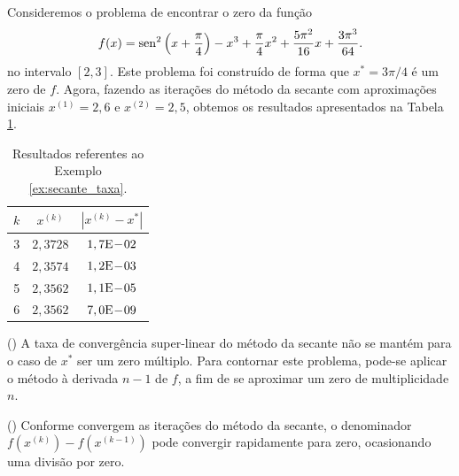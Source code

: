 \begin{ex}\label{ex:secante_taxa}
  Consideremos o problema de encontrar o zero da função
  \begin{equation}
    f(x) = \operatorname{sen}^2\left(x+\frac{\pi}{4}\right) - x^3 + \frac{\pi}{4}x^2 + \frac{5\pi^2}{16}x + \frac{3\pi^3}{64}.
  \end{equation}
  no intervalo $[2,3]$. Este problema foi construído de forma que $x^* = 3\pi/4$ é um zero de $f$. Agora, fazendo as iterações do método da secante com aproximações iniciais $x^{(1)}=2,6$ e $x^{(2)}=2,5$, obtemos os resultados apresentados na Tabela \ref{tab:ex_secante_taxa}.

\begin{table}[h!]
  \centering
  \caption{Resultados referentes ao Exemplo \ref{ex:secante_taxa}.}
  \label{tab:ex_secante_taxa}
  \begin{tabular}{r|cc}
    $k$ & $x^{(k)}$ & $|x^{(k)}-x^*|$ \\\hline
    3 & $2,3728$ & $1,7\mathrm{E}\!-\!02$ \\
    4 & $2,3574$ & $1,2\mathrm{E}\!-\!03$ \\
    5 & $2,3562$ & $1,1\mathrm{E}\!-\!05$ \\
    6 & $2,3562$ & $7,0\mathrm{E}\!-\!09$ \\\hline
  \end{tabular}
\end{table}

% 
\end{ex}


\begin{obs}()
  A taxa de convergência super-linear do método da secante não se mantém para o caso de $x^*$ ser um zero múltiplo. Para contornar este problema, pode-se aplicar o método à derivada $n-1$ de $f$, a fim de se aproximar um zero de multiplicidade $n$.
\end{obs}

\begin{obs}()
  Conforme convergem as iterações do método da secante, o denominador $f(x^{(k)})-f(x^{(k-1)})$ pode convergir rapidamente para zero, ocasionando uma divisão por zero.
\end{obs}


